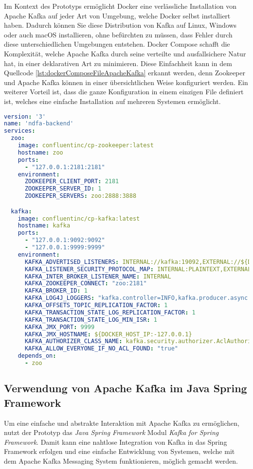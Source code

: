 Im Kontext des Prototyps ermöglicht Docker eine verlässliche Installation von Apache Kafka auf jeder Art von Umgebung, welche Docker selbst installiert haben. Dadurch können Sie diese Distribution von Kafka auf Linux, Windows oder auch macOS installieren, ohne befürchten zu müssen, dass Fehler durch diese unterschiedlichen Umgebungen entstehen. Docker Compose schafft die Komplexität, welche Apache Kafka durch seine verteilte und ausfallsichere Natur hat, in einer deklarativen Art zu minimieren. Diese Einfachheit kann in dem Quellcode \ref{lst:dockerComposeFileApacheKafka} erkannt werden, denn Zookeeper und Apache Kafka können in einer übersichtlichen Weise konfiguriert werden. Ein weiterer Vorteil ist, dass die ganze Konfiguration in einem einzigen File definiert ist, welches eine einfache Installation auf mehreren Systemen ermöglicht. 

\begin{lstlisting}[language={yaml},caption={Docker Compose File zur einfachen Einrichtung von Apache Kafka},captionpos=b,label={lst:dockerComposeFileApacheKafka}]
version: '3'
name: 'ndfa-backend'
services:
  zoo:
    image: confluentinc/cp-zookeeper:latest
    hostname: zoo
    ports:
      - "127.0.0.1:2181:2181"
    environment:
      ZOOKEEPER_CLIENT_PORT: 2181
      ZOOKEEPER_SERVER_ID: 1
      ZOOKEEPER_SERVERS: zoo:2888:3888

  kafka:
    image: confluentinc/cp-kafka:latest
    hostname: kafka
    ports:
      - "127.0.0.1:9092:9092"
      - "127.0.0.1:9999:9999"
    environment:
      KAFKA_ADVERTISED_LISTENERS: INTERNAL://kafka:19092,EXTERNAL://${DOCKER_HOST_IP:-127.0.0.1}:9092
      KAFKA_LISTENER_SECURITY_PROTOCOL_MAP: INTERNAL:PLAINTEXT,EXTERNAL:PLAINTEXT
      KAFKA_INTER_BROKER_LISTENER_NAME: INTERNAL
      KAFKA_ZOOKEEPER_CONNECT: "zoo:2181"
      KAFKA_BROKER_ID: 1
      KAFKA_LOG4J_LOGGERS: "kafka.controller=INFO,kafka.producer.async.DefaultEventHandler=INFO,state.change.logger=INFO"
      KAFKA_OFFSETS_TOPIC_REPLICATION_FACTOR: 1
      KAFKA_TRANSACTION_STATE_LOG_REPLICATION_FACTOR: 1
      KAFKA_TRANSACTION_STATE_LOG_MIN_ISR: 1
      KAFKA_JMX_PORT: 9999
      KAFKA_JMX_HOSTNAME: ${DOCKER_HOST_IP:-127.0.0.1}
      KAFKA_AUTHORIZER_CLASS_NAME: kafka.security.authorizer.AclAuthorizer
      KAFKA_ALLOW_EVERYONE_IF_NO_ACL_FOUND: "true"
    depends_on:
      - zoo
\end{lstlisting}

\subsection{Verwendung von Apache Kafka im Java Spring Framework}
\label{verwendungKafkaSpring}   
Um eine einfache und abstrakte Interaktion mit Apache Kafka zu ermöglichen, nutzt der Prototyp das \emph{Java Spring Framework} Modul \emph{Kafka for Spring Framework}. Damit kann eine nahtlose Integration von Kafka in das Spring Framework erfolgen und eine einfache Entwicklung von Systemen, welche mit dem Apache Kafka Messaging System funktionieren, möglich gemacht werden.

